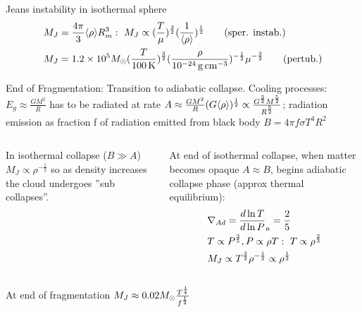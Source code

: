 \begin{frame}{Jeans instability in isothermal sphere}
	\begin{align*}
&M_J=\frac{4\pi}{3}\exv{\rho}R_m^3:\ M_J\propto(\frac{T}{\mu})^{\frac{3}{2}}(\frac{1}{\exv{\rho}})^{\frac{1}{2}}\tag{sper. instab.}\\
&M_J=\num{1.2e5}\msun{}(\frac{T}{\SI{100}{\kelvin}})^{\frac{3}{2}}(\frac{\rho}{\SI{e-24}{\gram\per\cubic\cm}})^{-\frac{1}{2}}\mu^{-\frac{3}{2}}\tag{pertub.}
	\end{align*}
\end{frame}



\begin{frame}{End of Fragmentation: Transition to adiabatic collapse.}
	Cooling processes: $E_g\approx\frac{GM^2}{R}$ has to be radiated at rate $A\approx\frac{GM^2}{R}(G\langle \rho \rangle)^{\frac{1}{2}}\propto\frac{G^{\frac{3}{2}}M^{\frac{5}{2}}}{R^{\frac{5}{2}}}$; radiation emission as fraction f of radiation emitted from black body $B=4\pi f\sigma T^4R^2$
	\begin{columns}[T]
		\begin{column}{0.5\textwidth}
In isothermal collapse ($B\gg A$) $M_J\propto\rho^{-\frac{1}{2}}$ so as density increases the cloud undergoes ''sub collapses''.
		\end{column}
		\begin{column}{0.5\textwidth}
At end of isothermal collapse, when matter becomes opaque $A\approx B$, begins adiabatic collapse phase (approx thermal equilibrium):
 \begin{align*}
&\nad=\TDly{P}{T}_a=\frac{2}{5}\\
&T\propto P^{\frac{2}{5}}, P\propto\rho T:\ T\propto\rho^{\frac{2}{3}}\\
&M_J\propto T^{\frac{3}{2}}\rho^{-\frac{1}{2}}\propto\rho^{\frac{1}{2}}
 \end{align*}
		\end{column}
	\end{columns}
At end of fragmentation $M_J\approx0.02M_{\odot}{}\frac{T^{\frac{1}{4}}}{f^{\frac{1}{2}}}$
\end{frame}

